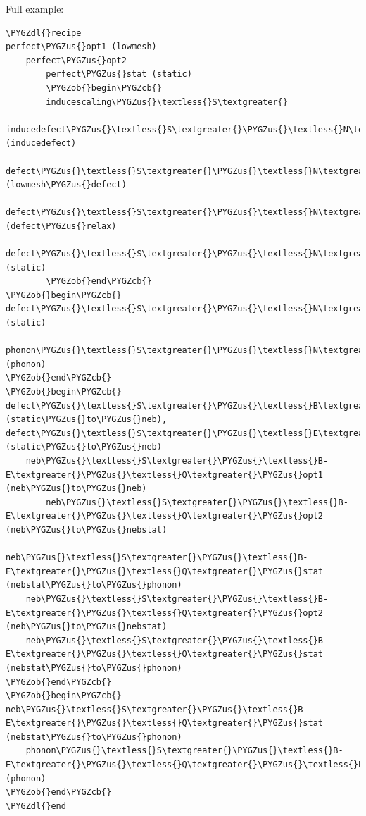 \documentclass[letterpaper,10pt,english]{sphinxmanual}
\def\PYGZus{\char`\_}
\def\PYGZob{\char`\{}
\def\PYGZcb{\char`\}}
\def\PYGZdl{\char`\$}
\begin{document}
Full example:

\begin{Verbatim}[commandchars=\\\{\}]
\PYGZdl{}recipe
perfect\PYGZus{}opt1 (lowmesh)
    perfect\PYGZus{}opt2
        perfect\PYGZus{}stat (static)
        \PYGZob{}begin\PYGZcb{}
        inducescaling\PYGZus{}\textless{}S\textgreater{}
            inducedefect\PYGZus{}\textless{}S\textgreater{}\PYGZus{}\textless{}N\textgreater{} (inducedefect)
                defect\PYGZus{}\textless{}S\textgreater{}\PYGZus{}\textless{}N\textgreater{}\PYGZus{}\textless{}Q\textgreater{}\PYGZus{}opt1 (lowmesh\PYGZus{}defect)
                    defect\PYGZus{}\textless{}S\textgreater{}\PYGZus{}\textless{}N\textgreater{}\PYGZus{}\textless{}Q\textgreater{}\PYGZus{}opt2 (defect\PYGZus{}relax)
                        defect\PYGZus{}\textless{}S\textgreater{}\PYGZus{}\textless{}N\textgreater{}\PYGZus{}\textless{}Q\textgreater{}\PYGZus{}stat (static)
        \PYGZob{}end\PYGZcb{}
\PYGZob{}begin\PYGZcb{}
defect\PYGZus{}\textless{}S\textgreater{}\PYGZus{}\textless{}N\textgreater{}\PYGZus{}\textless{}Q\textgreater{}\PYGZus{}stat (static)
    phonon\PYGZus{}\textless{}S\textgreater{}\PYGZus{}\textless{}N\textgreater{}\PYGZus{}\textless{}Q\textgreater{}\PYGZus{}\textless{}P\textgreater{} (phonon)
\PYGZob{}end\PYGZcb{}
\PYGZob{}begin\PYGZcb{}
defect\PYGZus{}\textless{}S\textgreater{}\PYGZus{}\textless{}B\textgreater{}\PYGZus{}\textless{}Q\textgreater{}\PYGZus{}stat (static\PYGZus{}to\PYGZus{}neb), defect\PYGZus{}\textless{}S\textgreater{}\PYGZus{}\textless{}E\textgreater{}\PYGZus{}\textless{}Q\textgreater{}\PYGZus{}stat (static\PYGZus{}to\PYGZus{}neb)
    neb\PYGZus{}\textless{}S\textgreater{}\PYGZus{}\textless{}B-E\textgreater{}\PYGZus{}\textless{}Q\textgreater{}\PYGZus{}opt1 (neb\PYGZus{}to\PYGZus{}neb)
        neb\PYGZus{}\textless{}S\textgreater{}\PYGZus{}\textless{}B-E\textgreater{}\PYGZus{}\textless{}Q\textgreater{}\PYGZus{}opt2 (neb\PYGZus{}to\PYGZus{}nebstat)
            neb\PYGZus{}\textless{}S\textgreater{}\PYGZus{}\textless{}B-E\textgreater{}\PYGZus{}\textless{}Q\textgreater{}\PYGZus{}stat (nebstat\PYGZus{}to\PYGZus{}phonon)
    neb\PYGZus{}\textless{}S\textgreater{}\PYGZus{}\textless{}B-E\textgreater{}\PYGZus{}\textless{}Q\textgreater{}\PYGZus{}opt2 (neb\PYGZus{}to\PYGZus{}nebstat)
    neb\PYGZus{}\textless{}S\textgreater{}\PYGZus{}\textless{}B-E\textgreater{}\PYGZus{}\textless{}Q\textgreater{}\PYGZus{}stat (nebstat\PYGZus{}to\PYGZus{}phonon)
\PYGZob{}end\PYGZcb{}
\PYGZob{}begin\PYGZcb{}
neb\PYGZus{}\textless{}S\textgreater{}\PYGZus{}\textless{}B-E\textgreater{}\PYGZus{}\textless{}Q\textgreater{}\PYGZus{}stat (nebstat\PYGZus{}to\PYGZus{}phonon)
    phonon\PYGZus{}\textless{}S\textgreater{}\PYGZus{}\textless{}B-E\textgreater{}\PYGZus{}\textless{}Q\textgreater{}\PYGZus{}\textless{}P\textgreater{} (phonon)
\PYGZob{}end\PYGZcb{}
\PYGZdl{}end
\end{Verbatim}
\end{document}
